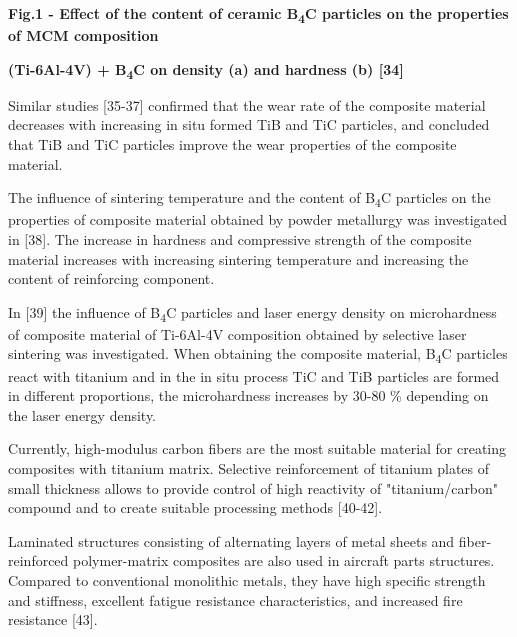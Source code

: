 
{\bfseries Fig.1 - Effect of the content of ceramic B\textsubscript{4}C
particles on the properties of MCM composition}

{\bfseries (Ti-6Al-4V) + B\textsubscript{4}C on density (a) and hardness
(b) {[}34{]}}

Similar studies {[}35-37{]} confirmed that the wear rate of the
composite material decreases with increasing in situ formed TiB and TiC
particles, and concluded that TiB and TiC particles improve the wear
properties of the composite material.

The influence of sintering temperature and the content of
B\textsubscript{4}C particles on the properties of composite material
obtained by powder metallurgy was investigated in {[}38{]}. The increase
in hardness and compressive strength of the composite material increases
with increasing sintering temperature and increasing the content of
reinforcing component.

In {[}39{]} the influence of B\textsubscript{4}C particles and laser
energy density on microhardness of composite material of Ti-6Al-4V
composition obtained by selective laser sintering was investigated. When
obtaining the composite material, B\textsubscript{4}C particles react
with titanium and in the in situ process TiC and TiB particles are
formed in different proportions, the microhardness increases by 30-80 \%
depending on the laser energy density.

Currently, high-modulus carbon fibers are the most suitable material for
creating composites with titanium matrix. Selective reinforcement of
titanium plates of small thickness allows to provide control of high
reactivity of "titanium/carbon" compound and to create suitable
processing methods {[}40-42{]}.

Laminated structures consisting of alternating layers of metal sheets
and fiber-reinforced polymer-matrix composites are also used in aircraft
parts structures. Compared to conventional monolithic metals, they have
high specific strength and stiffness, excellent fatigue resistance
characteristics, and increased fire resistance {[}43{]}.

